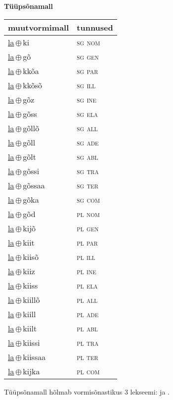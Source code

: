 

\vspace{3.5em}
\noindent \begin{minipage}{\textwidth}
\noindent \textbf{Tüüpsõnamall \,}\\

\begin{sideways}
\begin{tabular}{l l}
muutvormimall & tunnused \\
\hline
\underline{la}\,$\oplus$\,ki & \textsc{ sg nom } \\
\underline{la}\,$\oplus$\,gõ & \textsc{ sg gen } \\
\underline{la}\,$\oplus$\,kkõa & \textsc{ sg par } \\
\underline{la}\,$\oplus$\,kkõsõ & \textsc{ sg ill } \\
\underline{la}\,$\oplus$\,gõz & \textsc{ sg ine } \\
\underline{la}\,$\oplus$\,gõss & \textsc{ sg ela } \\
\underline{la}\,$\oplus$\,gõllõ & \textsc{ sg all } \\
\underline{la}\,$\oplus$\,gõll & \textsc{ sg ade } \\
\underline{la}\,$\oplus$\,gõlt & \textsc{ sg abl } \\
\underline{la}\,$\oplus$\,gõssi & \textsc{ sg tra } \\
\underline{la}\,$\oplus$\,gõssaa & \textsc{ sg ter } \\
\underline{la}\,$\oplus$\,gõka & \textsc{ sg com } \\
\underline{la}\,$\oplus$\,gõd & \textsc{ pl nom } \\
\underline{la}\,$\oplus$\,kijõ & \textsc{ pl gen } \\
\underline{la}\,$\oplus$\,kiit & \textsc{ pl par } \\
\underline{la}\,$\oplus$\,kiisõ & \textsc{ pl ill } \\
\underline{la}\,$\oplus$\,kiiz & \textsc{ pl ine } \\
\underline{la}\,$\oplus$\,kiiss & \textsc{ pl ela } \\
\underline{la}\,$\oplus$\,kiillõ & \textsc{ pl all } \\
\underline{la}\,$\oplus$\,kiill & \textsc{ pl ade } \\
\underline{la}\,$\oplus$\,kiilt & \textsc{ pl abl } \\
\underline{la}\,$\oplus$\,kiissi & \textsc{ pl tra } \\
\underline{la}\,$\oplus$\,kiissaa & \textsc{ pl ter } \\
\underline{la}\,$\oplus$\,kijka & \textsc{ pl com } \\
\end{tabular}
\end{sideways}
\label{tab:tüüpsõnamall-laki}

\end{minipage}

 
\vspace{1em}
\noindent Tüüpsõnamall  hõlmab vormisõnastikus 3 lekseemi:  ja .
